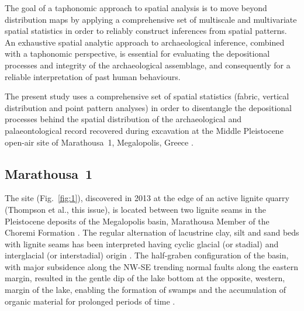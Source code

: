 \documentclass[preprint,authoryear,times]{elsarticle} %
\begin{document}
The goal of a taphonomic approach to spatial analysis is to move beyond distribution maps by applying a comprehensive set of multiscale and multivariate spatial statistics in order to reliably construct inferences from spatial patterns. An exhaustive spatial analytic approach to archaeological inference, combined with a taphonomic perspective, is essential for evaluating the depositional processes and integrity of the archaeological assemblage, and consequently for a reliable interpretation of past human behaviours.

The present study uses a comprehensive set of spatial statistics (fabric, vertical distribution and point pattern analyses) in order to disentangle the depositional processes behind the spatial distribution of the archaeological and palaeontological record recovered during excavation at the Middle Pleistocene open-air site of Marathousa~1, Megalopolis, Greece \citep{Panagopoulou2015,Harvati2016}.

\subsection{Marathousa~1}

The site (Fig.~\ref{fig:1}), discovered in 2013 at the edge of an active lignite quarry (Thompson et al., this issue), is located between two lignite seams in the Pleistocene deposits of the Megalopolis basin, Marathousa Member of the Choremi Formation \citep{Vugt2000}. The regular alternation of lacustrine clay, silt and sand beds with lignite seams has been interpreted having cyclic glacial (or stadial) and interglacial (or interstadial) origin \citep{Nickel1996}. The half-graben configuration of the basin, with major subsidence along the NW-SE trending normal faults along the eastern margin, resulted in the gentle dip of the lake bottom at the opposite, western, margin of the lake, enabling the formation of swamps and the accumulation of organic material for prolonged periods of time \citep{Vugt2000}.
\end{document}
